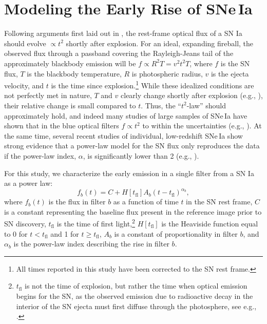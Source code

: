 \documentclass[twocolumn]{./aastex63}
\begin{document}



\section{Modeling the Early Rise of SNe\,Ia}\label{sec:model}

Following arguments first laid out in \citet{Riess99a}, the rest-frame optical
flux of a SN Ia should evolve $\propto t^2$ shortly after explosion. For an
ideal, expanding fireball, the observed flux through a passband covering the
Rayleigh-Jeans tail of the approximately blackbody emission will be $f \propto
R^2 T = v^2 t^2 T$, where $f$ is the SN flux, $T$ is the blackbody
temperature, $R$ is photospheric radius, $v$ is the ejecta velocity, and $t$
is the time since explosion.\footnote{All times reported in this study have
been corrected to the SN rest frame.} While these idealized conditions are not
perfectly met in nature, $T$ and $v$ clearly change shortly after explosion
(e.g., \citealt{Parrent12}), their relative change is small compared to $t$.
Thus, the ``$t^2$-law'' should approximately hold, and indeed many studies of
large samples of SNe\,Ia have shown that in the blue optical filters $f \propto
t^2$ to within the uncertainties (e.g., \citealt{Conley06, Hayden10,
Ganeshalingam11}). At the same time, several recent studies of individual,
low-redshift SNe\,Ia show strong evidence that a power-law model for the SN
flux only reproduces the data if the power-law index, $\alpha$, is
significantly lower than 2 (e.g.,
\citealt{Zheng13,Zheng14,Shappee16,Miller18,Fausnaugh19,Dimitriadis19}).

For this study, we characterize the early emission in a single filter from a
SN Ia as a power law:
%
\begin{equation}
    f_b(t) = C + H[t_\mathrm{fl}] A_b (t - t_\mathrm{fl})^{\alpha_b},
    \label{eqn:flux_model}
\end{equation}
%
where $f_b(t)$ is the flux in filter $b$ as a function of time $t$ in the SN
rest frame, $C$ is a constant representing the baseline flux present in the
reference image prior to SN discovery, $t_\mathrm{fl}$ is the time of first
light,\footnote{$t_\mathrm{fl}$ is not the time of explosion, but rather the
time when optical emission begins for the SN, as the observed emission due to
radioactive decay in the interior of the SN ejecta must first diffuse through
the photosphere, see e.g., \citet{Piro13,Piro14}.} $H[t_\mathrm{fl}]$ is the
Heaviside function equal to 0 for $t < t_\mathrm{fl}$ and 1 for $t \ge
t_\mathrm{fl}$, $A_b$ is a constant of proportionality in filter $b$, and
$\alpha_b$ is the power-law index describing the rise in filter $b$.
\end{document}
